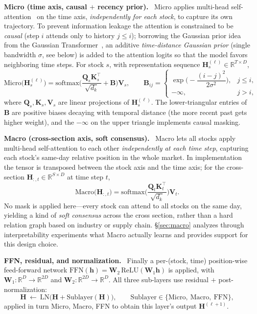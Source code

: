 \documentclass[a4paper,11pt]{article}
\newcommand{\comp}[1]{\par\smallskip\noindent\textbf{#1.}\ }
\begin{document}
\comp{Micro (time axis, causal $+$ recency prior)}
Micro applies multi-head self-attention~\cite{transformer} on the time axis,
\emph{independently for each stock}, to capture its own trajectory. To prevent
information leakage the attention is constrained to be \emph{causal} (step $i$
attends only to history $j\le i$); borrowing the Gaussian prior idea from the
Gaussian Transformer~\cite{gausstransformer}, an additive \emph{time-distance
Gaussian prior} (single bandwidth $\sigma$, see below) is added to the
attention logits so that the model favors neighboring time steps. For stock
$s$, with representation sequence $\bm{H}^{(\ell)}_{s}\in\mathbb{R}^{T\times D}$,
\begin{equation}\label{eq:micro}
\mathrm{Micro}\big(\bm{H}^{(\ell)}_{s}\big)=\mathrm{softmax}\!\Big(\frac{\bm{Q}_s\bm{K}_s^{\top}}{\sqrt{d_k}}+\bm{B}\Big)\bm{V}_s,
\qquad
\bm{B}_{ij}=\begin{cases}\exp\!\big(-\dfrac{(i-j)^2}{2\sigma^2}\big), & j\le i,\\[8pt] -\infty, & j>i,\end{cases}
\end{equation}
where $\bm{Q}_s,\bm{K}_s,\bm{V}_s$ are linear projections of
$\bm{H}^{(\ell)}_{s}$. The lower-triangular entries of $\bm{B}$ are positive
biases decaying with temporal distance (the more recent past gets higher
weight), and the $-\infty$ on the upper triangle implements causal masking.

\comp{Macro (cross-section axis, soft consensus)}
Macro lets all stocks apply multi-head self-attention to each other
\emph{independently at each time step}, capturing each stock's same-day
relative position in the whole market. In implementation the tensor is
transposed between the stock axis and the time axis; for the cross-section
$\bm{H}_{:,t}\in\mathbb{R}^{S\times D}$ at time step $t$,
\begin{equation}\label{eq:macro}
\mathrm{Macro}\big(\bm{H}_{:,t}\big)=\mathrm{softmax}\!\Big(\frac{\bm{Q}_t\bm{K}_t^{\top}}{\sqrt{d_k}}\Big)\bm{V}_t.
\end{equation}
No mask is applied here---every stock can attend to all stocks on the same day,
yielding a kind of \emph{soft consensus} across the cross section, rather than
a hard relation graph based on industry or supply chain. \S\ref{sec:macro}
analyzes through interpretability experiments what Macro actually learns and
provides support for this design choice.

\comp{FFN, residual, and normalization}
Finally a per-(stock, time) position-wise feed-forward network
$\mathrm{FFN}(\bm{h})=\bm{W}_2\,\mathrm{ReLU}(\bm{W}_1\bm{h})$ is applied, with
$\bm{W}_1:\mathbb{R}^{D}\!\to\!\mathbb{R}^{2D}$ and
$\bm{W}_2:\mathbb{R}^{2D}\!\to\!\mathbb{R}^{D}$. All three sub-layers use
residual $+$ post-normalization:
\begin{equation}\label{eq:residual}
\bm{H}\ \leftarrow\ \mathrm{LN}\big(\bm{H}+\mathrm{Sublayer}(\bm{H})\big),\qquad
\mathrm{Sublayer}\in\{\mathrm{Micro},\ \mathrm{Macro},\ \mathrm{FFN}\},
\end{equation}
applied in turn Micro, Macro, FFN to obtain this layer's output
$\bm{H}^{(\ell+1)}$.
\end{document}

